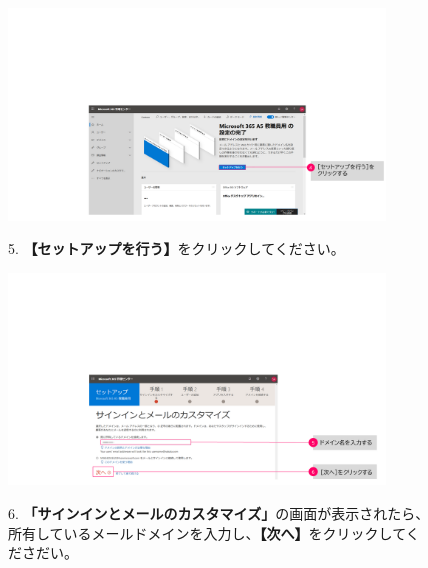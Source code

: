 \begin{figure}[h]
    \begin{minipage}{0.6\textwidth}
        \vspace{-2.1cm}
        \includegraphics[width=10cm]{figures/M365_setting1-03.png}
    \end{minipage}
    \begin{minipage}{0.4\textwidth}
        5. \textbf{【セットアップを行う】}をクリックしてください。
    \end{minipage}
\end{figure}

\begin{figure}[htbp]
    \begin{minipage}{0.6\textwidth}
        \vspace{-2cm}
        \includegraphics[width=10cm]{figures/M365_setting1-04.png}
    \end{minipage}
    \begin{minipage}{0.4\textwidth}
        6. \textbf{「サインインとメールのカスタマイズ」}の画面が表示されたら、所有しているメールドメインを入力し、\textbf{【次へ】}をクリックしてくださだい。
    \end{minipage}
    \vspace{0.5cm}
\end{figure}


